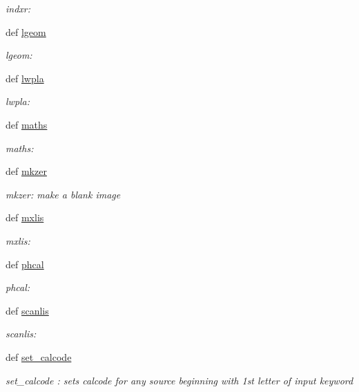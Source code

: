 \begin{DoxyCompactItemize}
\begin{DoxyCompactList}\small\item\em indxr\-: \end{DoxyCompactList}\item 
def \hyperlink{namespacefringe__tasks_adab9a7999fbfdd188472dadeb3f90061}{lgeom}
\begin{DoxyCompactList}\small\item\em lgeom\-: \end{DoxyCompactList}\item 
def \hyperlink{namespacefringe__tasks_a00a04a720cc72555f0ae059f25779ec9}{lwpla}
\begin{DoxyCompactList}\small\item\em lwpla\-: \end{DoxyCompactList}\item 
def \hyperlink{namespacefringe__tasks_a88f86d87604658175fbe3a0903b13346}{maths}
\begin{DoxyCompactList}\small\item\em maths\-: \end{DoxyCompactList}\item 
def \hyperlink{namespacefringe__tasks_a241ef1647082cf05edd1c686424ff701}{mkzer}
\begin{DoxyCompactList}\small\item\em mkzer\-: make a blank image \end{DoxyCompactList}\item 
def \hyperlink{namespacefringe__tasks_a8b29e6f20d9c502b92a2a96a28868a2c}{mxlis}
\begin{DoxyCompactList}\small\item\em mxlis\-: \end{DoxyCompactList}\item 
def \hyperlink{namespacefringe__tasks_a883137dd7fd6f1388a43e1c7d42266dc}{phcal}
\begin{DoxyCompactList}\small\item\em phcal\-: \end{DoxyCompactList}\item 
def \hyperlink{namespacefringe__tasks_ac3886042926f08aaf94ef29822079f9d}{scanlis}
\begin{DoxyCompactList}\small\item\em scanlis\-: \end{DoxyCompactList}\item 
def \hyperlink{namespacefringe__tasks_abaec81cfee62be800b35533d624fde36}{set\-\_\-calcode}
\begin{DoxyCompactList}\small\item\em set\-\_\-calcode \-: sets calcode for any source beginning with 1st letter of input keyword \end{DoxyCompactList}\item 

\end{DoxyCompactItemize}
